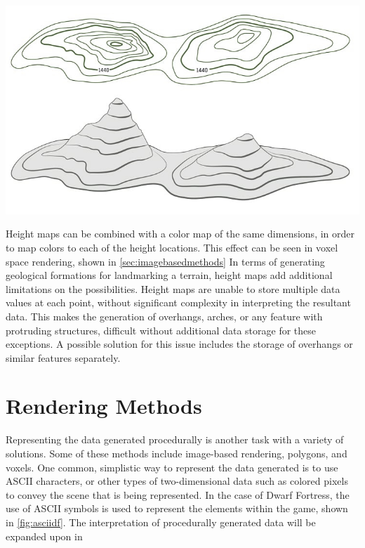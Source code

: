 \documentclass[10pt]{report}
\begin{document}
			\begin{minipage}{\textwidth}
				\centering
				\includegraphics[scale=.4]{top-map}
				\label{fig:top-map}
			\end{minipage} 
		
			Height maps can be combined with a color map of the same dimensions, in order to map colors to each of the height locations. This effect can be seen in voxel space rendering, shown in \ref{sec:imagebasedmethods} In terms of generating geological formations for landmarking a terrain, height maps add additional limitations on the possibilities. Height maps are unable to store multiple data values at each point, without significant complexity in interpreting the resultant data. This makes the generation of overhangs, arches, or any feature with protruding structures, difficult without additional data storage for these exceptions. A possible solution for this issue includes the storage of overhangs or similar features separately.
		
	\vspace{10pt}
	\let\clearpage\relax
	\chapter{Rendering Methods}
	
		Representing the data generated procedurally is another task with a variety of solutions. Some of these methods include image-based rendering, polygons, and voxels. One common, simplistic way to represent the data generated is to use ASCII characters, or other types of two-dimensional data such as colored pixels to convey the scene that is being represented. In the case of Dwarf Fortress, the use of ASCII symbols is used to represent the elements within the game, shown in \autoref{fig:asciidf}. The interpretation of procedurally generated data will be expanded upon in 
		
\end{document}
